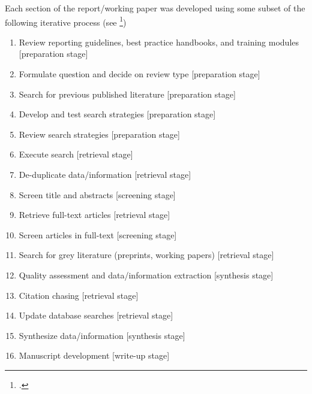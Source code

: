 \documentclass[11pt]{article}
\begin{document}
Each section of the report/working paper was developed using some subset of the following iterative process (see \footcite{tsafnat14})
\begin{enumerate}
    \item Review reporting guidelines, best practice handbooks, and training modules [preparation stage]
    \item Formulate question and decide on review type [preparation stage]
    \item Search for previous published literature [preparation stage]
    \item Develop and test search strategies [preparation stage]
    \item Review search strategies [preparation stage]
    \item Execute search [retrieval stage]
    \item De-duplicate data/information [retrieval stage]
    \item Screen title and abstracts [screening stage]
    \item Retrieve full-text articles [retrieval stage]
    \item Screen articles in full-text [screening stage]
    \item Search for grey literature (preprints, working papers) [retrieval stage]
    \item Quality assessment and data/information extraction [synthesis stage]
    \item Citation chasing [retrieval stage]
    \item Update database searches [retrieval stage]
    \item Synthesize data/information [synthesis stage]
    \item Manuscript development [write-up stage]
\end{enumerate}
\end{document}
